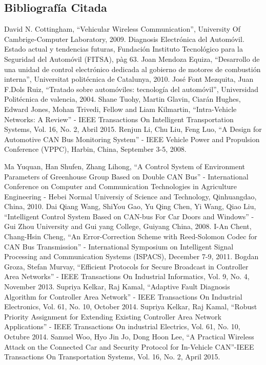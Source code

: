 \begin{thebibliography}{99}

\section*{Bibliografía Citada}

 David N. Cottingham, “Vehicular Wireless Communication”, University Of Cambrige-Computer Laboratory, 2009.
 Diagnosis Electrónica del Automóvil. Estado actual y tendencias futuras, Fundación Instituto Tecnológico para la Seguridad del Automóvil (FITSA), pàg 63.
 Joan Mendoza Equiza, “Desarrollo de una unidad de control electrónico dedicada al gobierno de motores de combustión interna”, Universitat politécnica de Catalunya, 2010.
 José Font Mezquita, Juan F.Dols Ruiz, “Tratado sobre automóviles: tecnología del automóvil”, Universidad Politécnica de valencia, 2004.
 Shane Tuohy, Martin Glavin, Ciarán Hughes, Edward Jones, Mohan Trivedi, Fellow  and Liam Kilmartin, “Intra-Vehicle Networks: A Review” - IEEE Transactions On Intelligent Transportation Systems, Vol. 16, No. 2, Abril 2015.
 Renjun Li, Chu Liu, Feng Luo, “A Design for Automotive CAN Bus Monitoring System” - IEEE Vehicle Power and Propulsion Conference (VPPC), Harbin, China, September 3-5, 2008.

 Ma Yuquan, Han Shufen, Zhang Lihong, “A Control System of Environment Parameters of Greenhouse Group Based on Double CAN Bus” - International Conference on Computer and Communication Technologies in Agriculture Engineering  - Hebei Normal Universiy of Science and Technology, Qinhuangdao, China, 2010. %
 Dai Qiang Wang, ShiYou Gao, Yu Qing Chen,  Yi Wang,  Qiao Liu, “Intelligent Control System Based on CAN-bus For Car Doors and Windows” - Gui Zhou University and Gui yang College, Guiyang China, 2008.
 I-An Chent, Chang-Hsin Cheng,  “An Error-Correction Scheme with Reed-Solomon Codec for CAN Bus Transmission” - International Symposium on Intelligent Signal Processing and Communication Systems (ISPACS), December 7-9, 2011.
 Bogdan Groza, Stefan Murvay, “Efficient Protocols for Secure Broadcast in Controller Area Networks” - IEEE Transactions On Industrial Informatics, Vol. 9, No. 4, November 2013. 
 Supriya Kelkar, Raj Kamal, “Adaptive Fault Diagnosis Algorithm for Controller Area Network” - IEEE Transactions On Industrial Electronics, Vol. 61, No. 10, October 2014. 
 Supriya Kelkar,  Raj Kamal, “Robust Priority Assignment for Extending Existing Controller Area Network  Applications” - IEEE Transactions On industrial Electrics, Vol. 61, No. 10, Octubre 2014.
 Samuel Woo, Hyo Jin Jo,  Dong Hoon Lee, “A Practical Wireless Attack on the Connected Car and Security Protocol for In-Vehicle CAN”-IEEE Transactions On Transportation Systems, Vol. 16, No. 2, April 2015.


\end{thebibliography}
